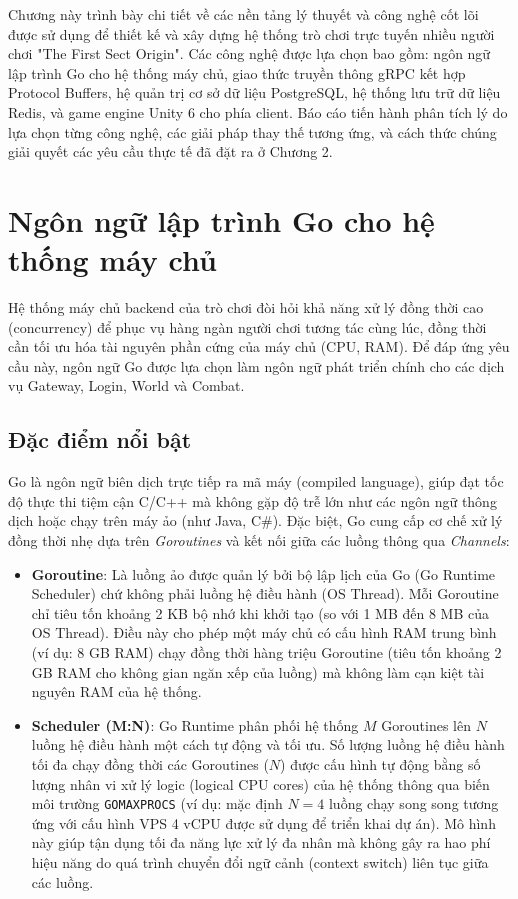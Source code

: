 \documentclass[../Project.tex]{subfiles}
\begin{document}
Chương này trình bày chi tiết về các nền tảng lý thuyết và công nghệ cốt lõi được sử dụng để thiết kế và xây dựng hệ thống trò chơi trực tuyến nhiều người chơi "The First Sect Origin". Các công nghệ được lựa chọn bao gồm: ngôn ngữ lập trình Go cho hệ thống máy chủ, giao thức truyền thông gRPC kết hợp Protocol Buffers, hệ quản trị cơ sở dữ liệu PostgreSQL, hệ thống lưu trữ dữ liệu Redis, và game engine Unity 6 cho phía client. Báo cáo tiến hành phân tích lý do lựa chọn từng công nghệ, các giải pháp thay thế tương ứng, và cách thức chúng giải quyết các yêu cầu thực tế đã đặt ra ở Chương 2.

\section{Ngôn ngữ lập trình Go cho hệ thống máy chủ}
\label{sec:tech_go}
Hệ thống máy chủ backend của trò chơi đòi hỏi khả năng xử lý đồng thời cao (concurrency) để phục vụ hàng ngàn người chơi tương tác cùng lúc, đồng thời cần tối ưu hóa tài nguyên phần cứng của máy chủ (CPU, RAM). Để đáp ứng yêu cầu này, ngôn ngữ Go \cite{donovan2015go} được lựa chọn làm ngôn ngữ phát triển chính cho các dịch vụ Gateway, Login, World và Combat.

\subsection{Đặc điểm nổi bật}
Go là ngôn ngữ biên dịch trực tiếp ra mã máy (compiled language), giúp đạt tốc độ thực thi tiệm cận C/C++ mà không gặp độ trễ lớn như các ngôn ngữ thông dịch hoặc chạy trên máy ảo (như Java, C\#). Đặc biệt, Go cung cấp cơ chế xử lý đồng thời nhẹ dựa trên \textit{Goroutines} và kết nối giữa các luồng thông qua \textit{Channels}:
\begin{itemize}
    \item \textbf{Goroutine}: Là luồng ảo được quản lý bởi bộ lập lịch của Go (Go Runtime Scheduler) chứ không phải luồng hệ điều hành (OS Thread). Mỗi Goroutine chỉ tiêu tốn khoảng 2 KB bộ nhớ khi khởi tạo (so với 1 MB đến 8 MB của OS Thread). Điều này cho phép một máy chủ có cấu hình RAM trung bình (ví dụ: 8 GB RAM) chạy đồng thời hàng triệu Goroutine (tiêu tốn khoảng 2 GB RAM cho không gian ngăn xếp của luồng) mà không làm cạn kiệt tài nguyên RAM của hệ thống.
    \item \textbf{Scheduler (M:N)}: Go Runtime phân phối hệ thống $M$ Goroutines lên $N$ luồng hệ điều hành một cách tự động và tối ưu. Số lượng luồng hệ điều hành tối đa chạy đồng thời các Goroutines ($N$) được cấu hình tự động bằng số lượng nhân vi xử lý logic (logical CPU cores) của hệ thống thông qua biến môi trường \texttt{GOMAXPROCS} (ví dụ: mặc định $N = 4$ luồng chạy song song tương ứng với cấu hình VPS 4 vCPU được sử dụng để triển khai dự án). Mô hình này giúp tận dụng tối đa năng lực xử lý đa nhân mà không gây ra hao phí hiệu năng do quá trình chuyển đổi ngữ cảnh (context switch) liên tục giữa các luồng.
\end{itemize}
\end{document}
